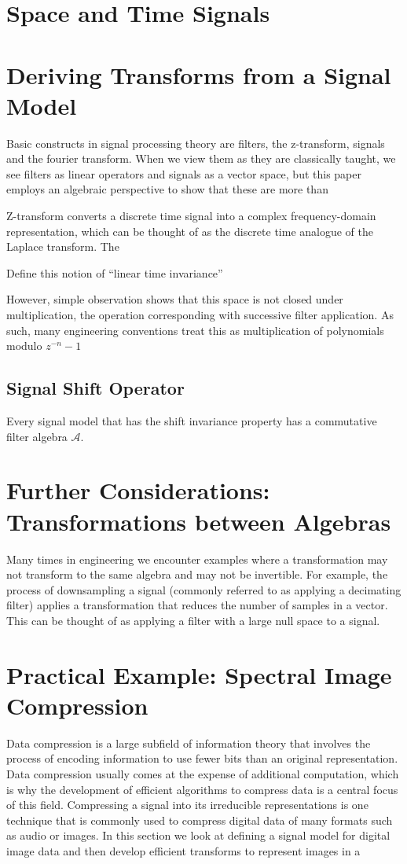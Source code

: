 \documentclass[12pt,technote]{IEEEtran}
\begin{document}
\section{Space and Time Signals}

\section{Deriving Transforms from a Signal Model}

\cite{AlgebraicSignalProcessing2006}
Basic constructs in signal processing theory are filters, the z-transform, signals and the fourier transform. When we view them as they are classically taught, we see filters as linear operators and signals as a vector space, but this paper employs an algebraic perspective to show that these are more than 

Z-transform converts a discrete time signal  into a complex frequency-domain representation, which can be thought of as the discrete time analogue of the Laplace transform. The 

Define this notion of ``linear time invariance''


However, simple observation shows that this space is not closed under multiplication, the operation corresponding with successive filter application. As such, many engineering conventions treat this as multiplication of polynomials modulo $z^{-n}-1$

\subsection{Signal Shift Operator}
Every signal model that has the shift invariance property has a commutative filter algebra $\mathcal{A}$.
\section{Further Considerations: Transformations between Algebras}
Many times in engineering we encounter examples where a transformation may not transform to the same algebra and may not be invertible. For example, the process of downsampling a signal (commonly referred to as applying a decimating filter) applies a transformation that reduces the number of samples in a vector. This can be thought of as applying a filter with a large null space to a signal.

\section{Practical Example: Spectral Image Compression}
Data compression is a large subfield of information theory that involves the process of encoding information to use fewer bits than an original representation. Data compression usually comes at the expense of additional computation, which is why the development of efficient algorithms to compress data is a central focus of this field. Compressing a signal into its irreducible representations is one technique that is commonly used to compress digital data of many formats such as audio or images. In this section we look at defining a signal model for digital image data and then develop efficient transforms to represent images in a 
\end{document}
